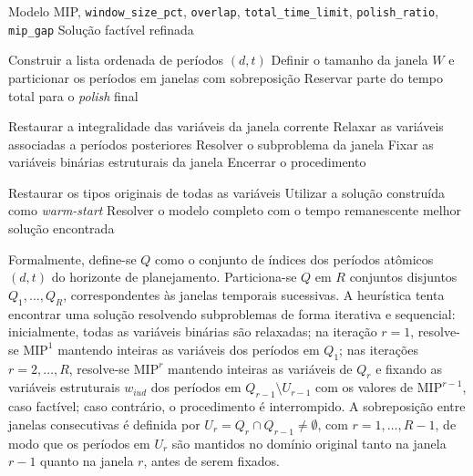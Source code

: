 \begin{algoritmo}
    \caption{Relax-and-Fix para alocação de médicos}
    \label{alg:rnf}
    \begin{algorithmic}[1]
        \Require Modelo MIP, \texttt{window\_size\_pct}, \texttt{overlap}, \texttt{total\_time\_limit}, \texttt{polish\_ratio}, \texttt{mip\_gap}
        \Ensure Solução factível refinada

        \State Construir a lista ordenada de períodos $(d,t)$
        \State Definir o tamanho da janela $W$ e particionar os períodos em janelas com sobreposição
        \State Reservar parte do tempo total para o \textit{polish} final

        \State Restaurar a integralidade das variáveis da janela corrente
        \State Relaxar as variáveis associadas a períodos posteriores
        \State Resolver o subproblema da janela
        \State Fixar as variáveis binárias estruturais da janela
        \Else
        \State Encerrar o procedimento
        \EndIf
        \EndFor

        \State Restaurar os tipos originais de todas as variáveis
        \State Utilizar a solução construída como \textit{warm-start}
        \State Resolver o modelo completo com o tempo remanescente
        \State \Return melhor solução encontrada
    \end{algorithmic}
\end{algoritmo}

Formalmente, define-se $Q$ como o conjunto de índices dos períodos atômicos $(d,t)$ do horizonte de planejamento. Particiona-se $Q$ em $R$ conjuntos disjuntos $Q_1, \ldots, Q_R$, correspondentes às janelas temporais sucessivas. A heurística tenta encontrar uma solução resolvendo subproblemas de forma iterativa e sequencial: inicialmente, todas as variáveis binárias são relaxadas; na iteração $r=1$, resolve-se $\text{MIP}^1$ mantendo inteiras as variáveis dos períodos em $Q_1$; nas iterações $r=2,\ldots,R$, resolve-se $\text{MIP}^r$ mantendo inteiras as variáveis de $Q_r$ e fixando as variáveis estruturais $w_{iud}$ dos períodos em $Q_{r-1} \setminus U_{r-1}$ com os valores de $\text{MIP}^{r-1}$, caso factível; caso contrário, o procedimento é interrompido. A sobreposição entre janelas consecutivas é definida por $U_r = Q_r \cap Q_{r-1} \neq \emptyset$, com $r=1,\ldots,R-1$, de modo que os períodos em $U_r$ são mantidos no domínio original tanto na janela $r-1$ quanto na janela $r$, antes de serem fixados.

